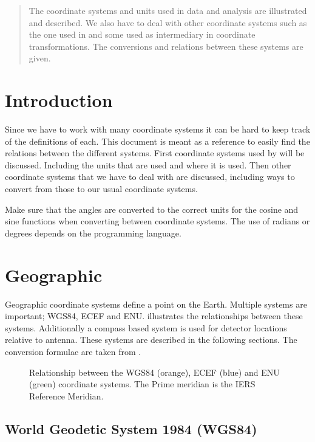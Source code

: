 \begin{abstract}

The coordinate systems and units used in \hisparc data and analysis are
illustrated and described. We also have to deal with other coordinate
systems such as the one used in \corsika and some used as intermediary
in coordinate transformations. The conversions and relations between
these systems are given.

\end{abstract}


\section{Introduction}

Since we have to work with many coordinate systems it can be hard to
keep track of the definitions of each. This document is meant as a
reference to easily find the relations between the different systems.
First coordinate systems used by \hisparc will be discussed. Including
the units that are used and where it is used. Then other coordinate
systems that we have to deal with are discussed, including ways to
convert from those to our usual coordinate systems.

Make sure that the angles are converted to the correct units for the
cosine and sine functions when converting between coordinate systems.
The use of radians or degrees depends on the programming language.


\section{Geographic}

Geographic coordinate systems define a point on the Earth. Multiple
systems are important; WGS84, ECEF and ENU. 
illustrates the relationships between these systems. Additionally a
compass based system is used for detector locations relative to \gps
antenna. These systems are described in the following sections. The
conversion formulae are taken from \cite{wikipedia:2014aa}.

\begin{figure}
    \centering
    
    \caption{Relationship between the WGS84 (orange), ECEF (blue) and ENU
             (green) coordinate systems. The Prime meridian is the IERS
             Reference Meridian.}
    \label{fig:wgs84_ecef_enu}
\end{figure}


\subsection{World Geodetic System 1984 (WGS84)}

